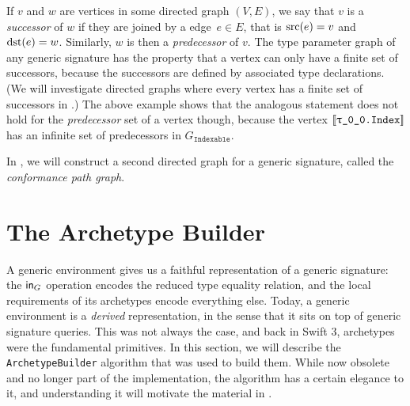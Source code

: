 \documentclass[../generics]{subfiles}
\begin{document}
\begin{example}
\begin{center}
\end{center}

If $v$ and $w$ are vertices in some directed graph $(V, E)$, we say that $v$ is a \emph{successor} of $w$ if they are joined by a edge~$e\in E$, that is $\operatorname{src}(e)=v$ and $\operatorname{dst}(e)=w$. Similarly, $w$ is then a \emph{predecessor} of $v$. The type parameter graph of any generic signature has the property that a vertex can only have a finite set of successors, because the successors are defined by associated type declarations. (We will investigate directed graphs where every vertex has a finite set of successors in .) The above example shows that the analogous statement does not hold for the \emph{predecessor} set of a vertex though, because the vertex $\archetype{\rT.Index}$ has an infinite set of predecessors in $G_\texttt{Indexable}$.
\end{example}

In , we will construct a second directed graph for a generic signature, called the \emph{conformance path graph}.

\section{The Archetype Builder}\label{archetype builder}

A generic environment gives us a faithful representation of a generic signature: the $\mathsf{in}_G$ operation encodes the reduced type equality relation, and the local requirements of its archetypes encode everything else. Today, a generic environment is a \emph{derived} representation, in the sense that it sits on top of generic signature queries. This was not always the case, and back in Swift 3, archetypes were the fundamental primitives. In this section, we will describe the \texttt{ArchetypeBuilder} algorithm that was used to build them. While now obsolete and no longer part of the implementation, the algorithm has a certain elegance to it, and understanding it will motivate the material in .
\end{document}
